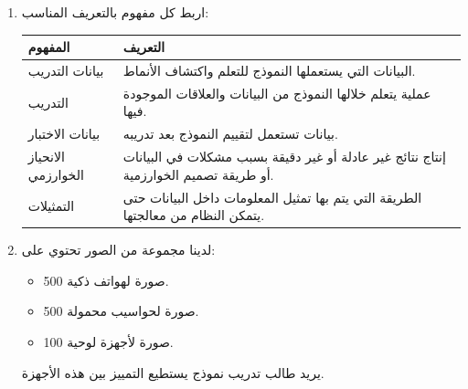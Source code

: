 \documentclass[a4paper]{article}
\begin{document}
\begin{enumerate}


\item اربط كل مفهوم بالتعريف المناسب:

\begin{center}

\begin{tabular}{|
>{\raggedleft\arraybackslash}m{4.2cm}|
>{\raggedleft\arraybackslash}m{10cm}|}

\hline
\textbf{المفهوم} & \textbf{التعريف} \\

\hline
بيانات التدريب
&
البيانات التي يستعملها النموذج للتعلم واكتشاف الأنماط.
\\
\hline

التدريب
&
عملية يتعلم خلالها النموذج من البيانات والعلاقات الموجودة فيها.
\\
\hline

بيانات الاختبار
&
بيانات تستعمل لتقييم النموذج بعد تدريبه.
\\
\hline

الانحياز الخوارزمي
&
إنتاج نتائج غير عادلة أو غير دقيقة بسبب مشكلات في البيانات
أو طريقة تصميم الخوارزمية.
\\
\hline

التمثيلات
&
الطريقة التي يتم بها تمثيل المعلومات داخل البيانات حتى يتمكن
النظام من معالجتها.
\\
\hline

\end{tabular}

\end{center}


\item لدينا مجموعة من الصور تحتوي على:

\begin{itemize}

    \item 500 صورة لهواتف ذكية.
    \item 500 صورة لحواسيب محمولة.
    \item 100 صورة لأجهزة لوحية.

\end{itemize}

يريد طالب تدريب نموذج يستطيع التمييز بين هذه الأجهزة.

\begin{enumerate}


\end{enumerate}
\end{enumerate}
\end{document}
